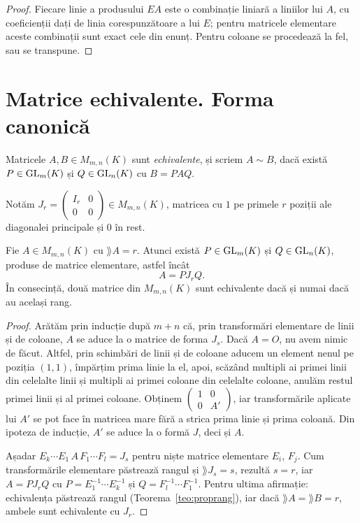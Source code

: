 \begin{proof}
Fiecare linie a produsului $EA$ este o combinație liniară a liniilor lui $A$, cu coeficienții dați de linia corespunzătoare a lui $E$; pentru matricele elementare aceste combinații sunt exact cele din enunț. Pentru coloane se procedează la fel, sau se transpune.
\end{proof}

\section{Matrice echivalente. Forma canonică}

\begin{definitie}
Matricele $A,B\in M_{m,n}(K)$ sunt \emph{echivalente}, și scriem $A\sim B$, dacă există $P\in\mathrm{GL}_m(K)$ și $Q\in\mathrm{GL}_n(K)$ cu $B=PAQ$.
\end{definitie}

Notăm $J_r=\begin{pmatrix}I_r&0\\0&0\end{pmatrix}\in M_{m,n}(K)$, matricea cu $1$ pe primele $r$ poziții ale diagonalei principale și $0$ în rest.

\begin{teorema}\label{teo:formacanonica}
Fie $A\in M_{m,n}(K)$ cu $\rang A=r$. Atunci există $P\in\mathrm{GL}_m(K)$ și $Q\in\mathrm{GL}_n(K)$, produse de matrice elementare, astfel încât
\[
A=PJ_rQ .
\]
În consecință, două matrice din $M_{m,n}(K)$ sunt echivalente dacă și numai dacă au același rang.
\end{teorema}

\begin{proof}
Arătăm prin inducție după $m+n$ că, prin transformări elementare de linii și de coloane, $A$ se aduce la o matrice de forma $J_s$. Dacă $A=O$, nu avem nimic de făcut. Altfel, prin schimbări de linii și de coloane aducem un element nenul pe poziția $(1,1)$, împărțim prima linie la el, apoi, scăzând multipli ai primei linii din celelalte linii și multipli ai primei coloane din celelalte coloane, anulăm restul primei linii și al primei coloane. Obținem $\begin{pmatrix}1&0\\0&A'\end{pmatrix}$, iar transformările aplicate lui $A'$ se pot face în matricea mare fără a strica prima linie și prima coloană. Din ipoteza de inducție, $A'$ se aduce la o formă $J$, deci și $A$.

Așadar $E_k\cdots E_1\,A\,F_1\cdots F_l=J_s$ pentru niște matrice elementare $E_i$, $F_j$. Cum transformările elementare păstrează rangul și $\rang J_s=s$, rezultă $s=r$, iar $A=PJ_rQ$ cu $P=E_1^{-1}\cdots E_k^{-1}$ și $Q=F_l^{-1}\cdots F_1^{-1}$. Pentru ultima afirmație: echivalența păstrează rangul (Teorema~\ref{teo:proprang}), iar dacă $\rang A=\rang B=r$, ambele sunt echivalente cu $J_r$.
\end{proof}

